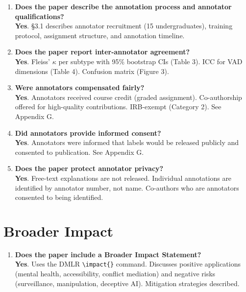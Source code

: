 \documentclass[11pt]{article}
\newcommand{\yes}{\textcolor{green!60!black}{\textbf{Yes}}}
\begin{document}
\begin{enumerate}[leftmargin=*]
    \item \textbf{Does the paper describe the annotation process and annotator qualifications?} \\
    \yes. \S3.1 describes annotator recruitment (15 undergraduates), training protocol, assignment structure, and annotation timeline.

    \item \textbf{Does the paper report inter-annotator agreement?} \\
    \yes. Fleiss' $\kappa$ per subtype with 95\% bootstrap CIs (Table 3). ICC for VAD dimensions (Table 4). Confusion matrix (Figure 3).

    \item \textbf{Were annotators compensated fairly?} \\
    \yes. Annotators received course credit (graded assignment). Co-authorship offered for high-quality contributions. IRB-exempt (Category 2). See Appendix G.

    \item \textbf{Did annotators provide informed consent?} \\
    \yes. Annotators were informed that labels would be released publicly and consented to publication. See Appendix G.

    \item \textbf{Does the paper protect annotator privacy?} \\
    \yes. Free-text explanations are not released. Individual annotations are identified by annotator number, not name. Co-authors who are annotators consented to being identified.
\end{enumerate}

\section{Broader Impact}

\begin{enumerate}[leftmargin=*]
    \item \textbf{Does the paper include a Broader Impact Statement?} \\
    \yes. Uses the DMLR \texttt{\textbackslash impact\{\}} command. Discusses positive applications (mental health, accessibility, conflict mediation) and negative risks (surveillance, manipulation, deceptive AI). Mitigation strategies described.
\end{enumerate}
\end{document}
